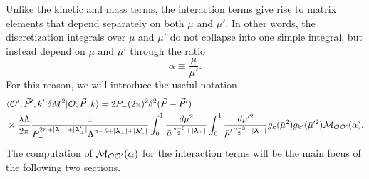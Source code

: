 \begin{subappendices}
Unlike the kinetic and mass terms, the interaction terms give rise to matrix 
elements that depend separately on both $\mu$ and $\mu'$. In other words, the 
discretization integrals over $\mu$ and $\mu'$ do not collapse into one simple 
integral, but instead depend on $\mu$ and $\mu'$ through the ratio 
\begin{equation}
    \boxed{\alpha \equiv \frac{\mu}{\mu'} .}
\end{equation} 
For this reason, we will introduce the useful notation 
\begin{equation}
    \begin{aligned}
        &\langle {\cal O}'; \vec{P}', k'| \delta M^2 |{\cal O}; \vec{P}, k\rangle = 2P_- (2\pi)^2 \delta^2(\vec{P}- \vec{P}') \\
        &\times  \frac{\lambda \Lambda}{2\pi} \frac{1}{P_-^{2n+ |\boldsymbol{\lambda}_-|+|\boldsymbol{\lambda}^{\prime}_\bot|} \Lambda^{n-5 + |\boldsymbol{\lambda}_\bot|+|\boldsymbol{\lambda}^{\prime}_-|}}\int_0^{1} \frac{d\bar{\mu}^2}{\bar{\mu}^{\frac{n-3}{2} + |\boldsymbol{\lambda}_\bot|}} \int_0^{1} \frac{d\bar{\mu}^{\prime 2}}{\bar{\mu}^{\prime \frac{n-3}{2} + |\boldsymbol{\lambda}_\bot|}}  g_k(\bar{\mu}^2) g_{k'}(\bar{\mu}^{\prime 2}) {\cal M}_{{\cal O} {\cal O}'}(\alpha).
    \end{aligned}
\end{equation} 
The computation of ${\cal M}_{{\cal O} {\cal O}'}(\alpha)$ for the interaction terms will 
be the main focus of the following two sections. 


\end{subappendices}
